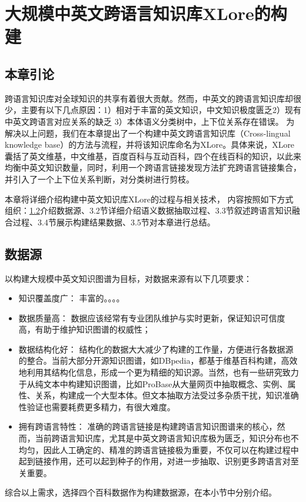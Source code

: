 \chapter{大规模中英文跨语言知识库XLore的构建}
\label{cha:intro}

\section{本章引论}

跨语言知识库对全球知识的共享有着很大贡献。然而，中英文的跨语言知识库却很少，主要有以下几点原因：1）相对于丰富的英文知识，中文知识极度匮乏2）现有中英文跨语言对应关系的缺乏 3）本体语义分类树中，上下位关系存在错误。 为解决以上问题，我们在本章提出了一个构建中英文跨语言知识库（Cross-lingual knowledge base）的方法与流程，并将该知识库命名为XLore。具体来说，XLore囊括了英文维基，中文维基，百度百科与互动百科，四个在线百科的知识，以此来均衡中英文知识数量，同时，利用一个跨语言链接发现方法扩充跨语言链接集合，并引入了一个上下位关系判断，对分类树进行剪枝。

本章将详细介绍构建中英文知识库XLore的过程与相关技术， 内容按照如下方式组织：\ref{sec3:datasource}介绍数据源、3.2节详细介绍语义数据抽取过程、3.3节叙述跨语言知识融合过程、3.4节展示构建结果数据、3.5节对本章进行总结。


\section{数据源}
\label{sec3:datasource}

以构建大规模中英文知识图谱为目标，对数据来源有以下几项要求：

\begin{itemize}
\item  {\heiti 知识覆盖度广：} 丰富的。。。。
\item  {\heiti 数据质量高：} 数据应该经常有专业团队维护与实时更新，保证知识可信度高，有助于维护知识图谱的权威性；
\item  {\heiti 数据结构化好：} 结构化的数据大大减少了构建的工作量，方便进行各数据源的整合。当前大部分开源知识图谱，如DBpedia，都基于维基百科构建，高效地利用其结构化信息，形成一个更为精细的知识源。当然，也有一些研究致力于从纯文本中构建知识图谱，比如ProBase从大量网页中抽取概念、实例、属性、关系，构建成一个大型本体。但文本抽取方法受过多杂质干扰，知识准确性验证也需要耗费更多精力，有很大难度。
\item  {\heiti 拥有跨语言特性：} 准确的跨语言链接是构建跨语言知识图谱来的核心，然而，当前跨语言知识库，尤其是中英文跨语言知识库极为匮乏，知识分布也不均匀，因此人工确定的、精准的跨语言链接极为重要，不仅可以在构建过程中起到链接作用，还可以起到种子的作用，对进一步抽取、识别更多跨语言对至关重要。
\end{itemize}
综合以上需求，选择四个百科数据作为构建数据源，在本小节中分别介绍。

